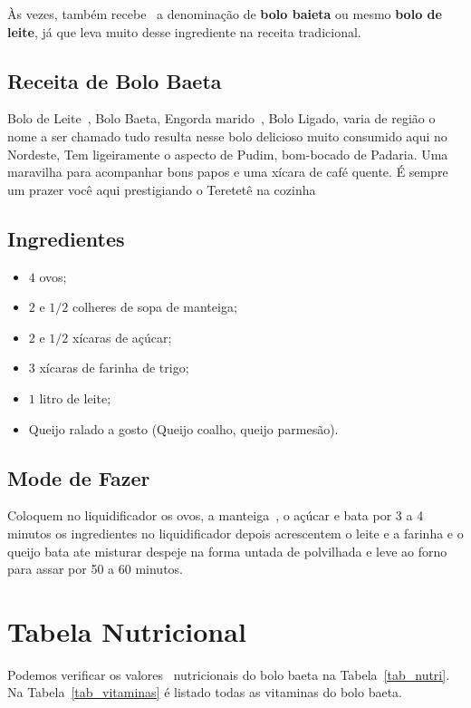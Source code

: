 \documentclass[a4paper,11pt,twocolumn]{article}
\begin{document}
Às vezes, também recebe~\cite{Diday:1991} a denominação de \textbf{bolo baieta} ou mesmo \textbf{bolo de leite}, já que leva muito desse ingrediente na receita tradicional.

\subsection{Receita de Bolo Baeta}

Bolo de Leite~\cite{Roque:2007}, Bolo Baeta, Engorda marido~\cite{Afonso:2004}, Bolo Ligado, varia de região o nome a ser chamado tudo resulta nesse bolo delicioso muito consumido aqui no Nordeste, Tem ligeiramente o aspecto de Pudim, bom-bocado de Padaria. Uma maravilha para acompanhar bons papos e uma xícara de café quente. É sempre um prazer você aqui prestigiando o Teretetê na cozinha

\subsection{Ingredientes}

\begin{itemize}
  \item $4$ ovos;
  \item $2$ e $1/2$ colheres de sopa de manteiga;
  \item $2$ e $1/2$ xícaras de açúcar;
  \item $3$ xícaras de farinha de trigo;
  \item $1$ litro de leite;
  \item Queijo ralado a gosto (Queijo coalho, queijo parmesão).
\end{itemize}

\subsection{Mode de Fazer}

Coloquem no liquidificador os ovos, a manteiga~\cite{Zisserman:2012}, o açúcar e bata por 3 a 4 minutos os ingredientes no liquidificador depois acrescentem o leite e a farinha e o queijo bata ate misturar despeje na forma untada de polvilhada e leve ao forno para assar por 50 a 60 minutos.

\section{Tabela Nutricional}

Podemos verificar os valores~\cite{Tamura:1978} nutricionais do bolo baeta na Tabela~\ref{tab_nutri}. Na Tabela~\ref{tab_vitaminas} é listado todas as vitaminas do bolo baeta.
\end{document}
